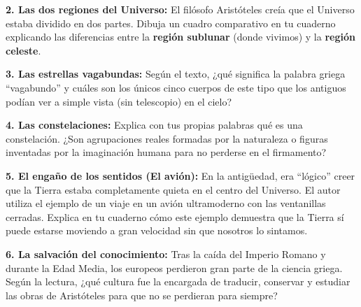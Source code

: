\documentclass[12pt, letterpaper]{article}
\newif\ifshowanswers
\newcommand{\respAbierta}[2][3cm]{
	\ifshowanswers
	\par\vspace{0.2cm}
	\textbf{\textcolor{blue}{Respuesta:}} \textcolor{blue}{#2}
	\vspace{0.2cm}
	\else
	\par\vspace{#1} %
	\fi
}
\begin{document}
	\vspace{0.3cm}
	\noindent \textbf{2. Las dos regiones del Universo:} El filósofo Aristóteles creía que el Universo estaba dividido en dos partes. Dibuja un cuadro comparativo en tu cuaderno explicando las diferencias entre la \textbf{región sublunar} (donde vivimos) y la \textbf{región celeste}.
	\respAbierta[3cm]{La región sublunar (debajo de la Luna) está compuesta por materia imperfecta, mortal y que cambia constantemente. La región celeste (más allá de la Luna) está compuesta por cuerpos perfectos, eternos y que se mueven de acuerdo con leyes inmutables.}
	
	\vspace{0.3cm}
	\noindent \textbf{3. Las estrellas vagabundas:} Según el texto, ¿qué significa la palabra griega ``vagabundo'' y cuáles son los únicos cinco cuerpos de este tipo que los antiguos podían ver a simple vista (sin telescopio) en el cielo?
	\respAbierta[2cm]{La palabra ``vagabundo'' significa planeta. Los únicos cinco planetas que se podían ver a simple vista eran Mercurio, Venus, Marte, Júpiter y Saturno.}
	
	\vspace{0.3cm}
	\noindent \textbf{4. Las constelaciones:} Explica con tus propias palabras qué es una constelación. ¿Son agrupaciones reales formadas por la naturaleza o figuras inventadas por la imaginación humana para no perderse en el firmamento? 
	\respAbierta[2cm]{Las constelaciones no son reales en el espacio; son figuras imaginarias creadas por los antiguos uniendo las estrellas con líneas invisibles para orientarse y no perderse en el firmamento.}
	
	\vspace{0.3cm}
	\noindent \textbf{5. El engaño de los sentidos (El avión):} En la antigüedad, era ``lógico'' creer que la Tierra estaba completamente quieta en el centro del Universo. El autor utiliza el ejemplo de un viaje en un avión ultramoderno con las ventanillas cerradas. Explica en tu cuaderno cómo este ejemplo demuestra que la Tierra sí puede estarse moviendo a gran velocidad sin que nosotros lo sintamos.
	\respAbierta[2.5cm]{Al viajar en un avión muy suave, sin turbulencias y con las ventanillas cerradas, no sentimos el movimiento. De la misma manera, la Tierra puede viajar por el espacio a gran velocidad sin que lo sintamos, ya que no tenemos referencias externas ni sacudidas.}
	
	\vspace{0.3cm}
	\noindent \textbf{6. La salvación del conocimiento:} Tras la caída del Imperio Romano y durante la Edad Media, los europeos perdieron gran parte de la ciencia griega. Según la lectura, ¿qué cultura fue la encargada de traducir, conservar y estudiar las obras de Aristóteles para que no se perdieran para siempre?
	\respAbierta[1.5cm]{Fueron los árabes quienes se encargaron de traducir, conservar y estudiar todo el conocimiento de Aristóteles y los antiguos griegos.}
	
\end{document}
